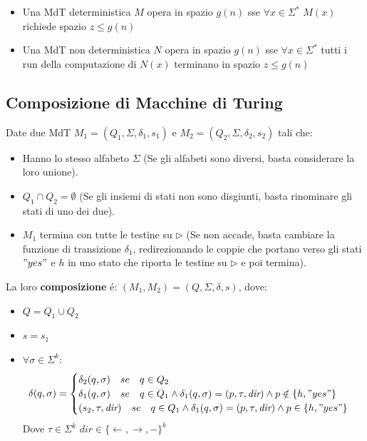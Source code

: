 \begin{itemize}
\item {Una MdT deterministica $M$ {opera} in spazio $g(n)$ sse $\forall x \in \Sigma^*$ $M(x)$ richiede spazio $z \leq g(n)$}
\item {Una MdT non deterministica $N$ {opera} in spazio $g(n)$ sse $\forall x \in \Sigma^*$ tutti i run della computazione di $N(x)$ terminano in spazio $z \leq g(n)$}
\end{itemize}


\subsection{Composizione di Macchine di Turing}
Date due MdT $M_1 = (Q_1, \Sigma, \delta_1, s_1)$ e $M_2 = (Q_2, \Sigma, \delta_2, s_2)$ tali che:
\begin{itemize}
	\item Hanno lo stesso alfabeto $\Sigma$ 
	\subitem (Se gli alfabeti sono diversi, basta considerare la loro unione).
	\item $Q_1 \cap Q_2 = \emptyset$ 
	\subitem (Se gli insiemi di stati non sono disgiunti, basta rinominare gli stati di uno dei due).
	\item $M_1$ termina con tutte le testine su $\triangleright$ 
	\subitem (Se non accade, basta cambiare la funzione di transizione $\delta_1$, redirezionando le coppie che portano verso gli stati $"yes"$ e $h$ in uno stato che riporta le testine su $\triangleright$ e poi termina).
\end{itemize}

La loro \textbf{composizione} é: $(M_1, M_2) =  (Q, \Sigma, \delta, s)$, dove: 
\begin{itemize}
	\item $Q = Q_1 \cup Q_2$
	\item $s = s_1$
	\item $\forall \sigma \in \Sigma^k$:
	\[
	\delta(q, \sigma) =
	\begin{cases} 
		\delta_2(q, \sigma)  \quad se \quad q \in Q_2 \\
		\delta_1(q, \sigma) \quad se \quad q \in Q_1 \land \delta_1(q, \sigma)  = (p, \tau, \textit{dir}) \land p \notin \{h, "yes"\} \\
		(s_2, \tau, \textit{dir}) \quad se \quad q \in Q_1 \land  \delta_1(q, \sigma)  = (p, \tau, \textit{dir}) \land p \in \{h, "yes"\} \\
	\end{cases}
	\]
	Dove $\tau \in \Sigma^k$ \quad $\textit{dir} \in \{\leftarrow, \rightarrow, -\}^k$
\end{itemize}

